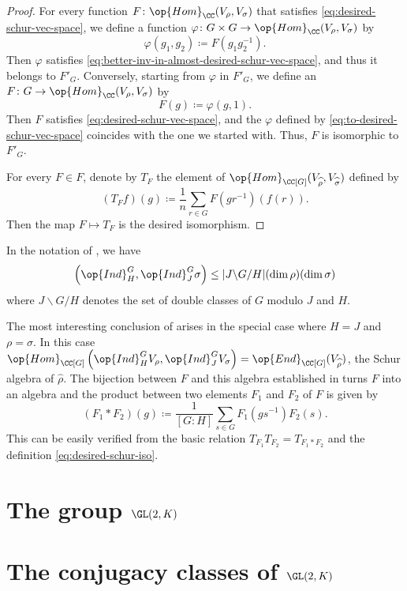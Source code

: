\documentclass[../main.tex]{subfiles}
\begin{document}
\begin{proof}
	For every function $F\colon\op{Hom}_\CC(V_\rho,V_\sigma)$ that satisfies \eqref{eq:desired-schur-vec-space}, we define a function $\varphi\colon G\times G\to\op{Hom}_\CC(V_\rho,V_\sigma)$ by
	\begin{equation}
		\varphi(g_1,g_2)\coloneqq F\left(g_1g_2^{-1}\right). \label{eq:to-desired-schur-vec-space}
	\end{equation}
	Then $\varphi$ satisfies \eqref{eq:better-inv-in-almost-desired-schur-vec-space}, and thus it belongs to $F'_G$. Conversely, starting from $\varphi$ in $F'_G$, we define an $F\colon G\to\op{Hom}_\CC(V_\rho,V_\sigma)$ by
	\[F(g)\coloneqq\varphi(g,1).\]
	Then $F$ satisfies \eqref{eq:desired-schur-vec-space}, and the $\varphi$ defined by \eqref{eq:to-desired-schur-vec-space} coincides with the one we started with. Thus, $F$ is isomorphic to $F'_G$.

	For every $F\in F$, denote by $T_F$ the element of $\op{Hom}_{\CC[G]}(V_{\widehat\rho},V_{\widehat\sigma})$ defined by
	\begin{equation}
		(T_Ff)(g)\coloneqq\frac1n\sum_{r\in G}F\left(gr^{-1}\right)(f(r)). \label{eq:desired-schur-iso}
	\end{equation}
	Then the map $F\mapsto T_F$ is the desired isomorphism.
\end{proof}
\begin{corollary}
	In the notation of , we have
	\[\left(\op{Ind}^G_H,\op{Ind}^G_J\sigma\right)\le|J\backslash G/H|(\dim\rho)(\dim\sigma)\]
	where $J\backslash G/H$ denotes the set of double classes of $G$ modulo $J$ and $H$.
\end{corollary}

The most interesting conclusion of  arises in the special case where $H=J$ and $\rho=\sigma$. In this case $\op{Hom}_{\CC[G]}\left(\op{Ind}^G_HV_\rho,\op{Ind}^G_JV_\sigma\right)=\op{End}_{\CC[G]}(V_{\widehat\rho})$, the Schur algebra of $\widehat\rho$. The bijection between $F$ and this algebra established in  turns $F$ into an algebra and the product between two elements $F_1$ and $F_2$ of $F$ is given by
\begin{equation}
	(F_1*F_2)(g)\coloneqq\frac1{[G:H]}\sum_{s\in G}F_1\left(gs^{-1}\right)F_2(s). \label{eq:better-schur-ind-mult}
\end{equation}
This can be easily verified from the basic relation $T_{F_1}T_{F_2}=T_{F_1*F_2}$ and the definition \eqref{eq:desired-schur-iso}.

\section{The group \texorpdfstring{$\GL(2,K)$}{ GL(2,K)}}

\section{The conjugacy classes of \texorpdfstring{$\GL(2,K)$}{ GL(2,K)}}
\end{document}
